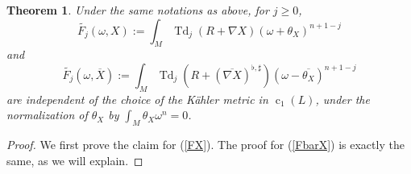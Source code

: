 \documentclass[10pt,a4paper]{amsart}
\newtheorem{thm}{Theorem}
\DeclareMathOperator{\Td}{Td}
\DeclareMathOperator{\cc}{c}
\begin{document}
\begin{thm}\label{futbar}
Under the same notations as above, for $j\geq 0$, 
\begin{equation}\label{FX}
\widetilde{F_j}(\omega,X):=\int_M \Td_j(R+\nabla X)(\omega+\theta_X)^{n+1-j} 
\end{equation}
and
\begin{equation}\label{FbarX}
\widetilde{F_j}(\omega,\overline{X}):=\int_M \Td_j(R+(\overline{\nabla X})^{\flat,\sharp})(\omega-\overline{\theta_X})^{n+1-j} 
\end{equation}
are independent of the choice of the K\"ahler metric in $\cc_1(L)$, under the normalization of $\theta_X$ by $\int_M \theta_X \omega^n =0$. 
\end{thm}

\begin{proof}
We first prove the claim for (\ref{FX}). The proof for (\ref{FbarX}) is exactly the same, as we will explain.


\end{proof}
\end{document}
